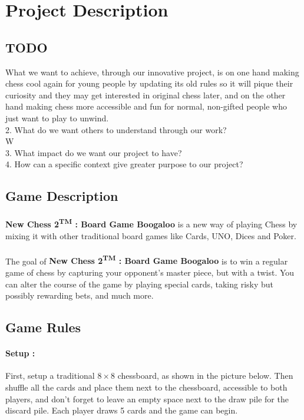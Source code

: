 \documentclass[12pt]{article}
\begin{document}
    \section{Project Description}
        \subsection{TODO}
            What we want to achieve, through our innovative project, is on one hand making chess cool again for young people by updating its old rules so it will pique their curiosity and they may get interested in original chess later, and on the other hand making chess more accessible and fun for normal, non-gifted people who just want to play to unwind.
            \\2. What do we want others to understand through our work?
            \\W
            \\3. What impact do we want our project to have?
            \\4. How can a specific context give greater purpose to our project?

        \subsection{Game Description}
            \paragraph{}
                \textbf{New Chess 2\textsuperscript{TM} : Board Game Boogaloo} is a new way of playing Chess by mixing it with other traditional board games like Cards, UNO, Dices and Poker.
            \paragraph{}
                The goal of \textbf{New Chess 2\textsuperscript{TM} : Board Game Boogaloo} is to win a regular game of chess by capturing your opponent's master piece, but with a twist. You can alter the course of the game by playing special cards, taking risky but possibly rewarding bets, and much more.
        \subsection{Game Rules}
            \paragraph{Setup :\\}
                First, setup a traditional $8\times8$ chessboard, as shown in the picture below. Then shuffle all the cards and place them next to the chessboard, accessible to both players, and don't forget to leave an empty space next to the draw pile for the discard pile. Each player draws 5 cards and the game can begin.
\end{document}
